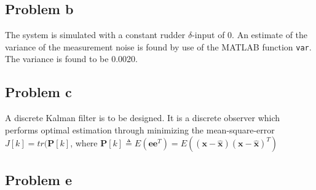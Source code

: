 \subsection{Problem b}
The system is simulated with a constant rudder $\delta$-input of 0. An estimate of the variance of 
the measurement noise is found by use of the MATLAB function {\texttt{var}}.  The variance 
is found to be 0.0020.

\subsection{Problem c}
A discrete Kalman filter is to be designed. It is a discrete observer which performs optimal estimation through minimizing the mean-square-error $J[k] = tr(\bm{P}[k]$, where $\bm{P}[k] \triangleq E(\bm{e}\bm{e}^T) = E((\bm{x} - \hat{\bm{x}})(\bm{x} - \hat{\bm{x}})^T)$
\\

\subsection{Problem e}
